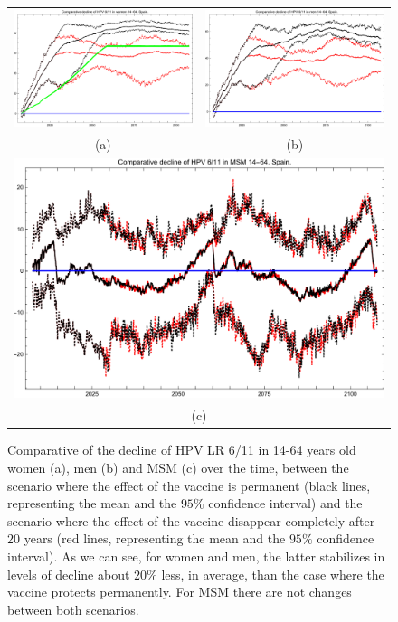 \begin{figure}[!]
	\centering
	\begin{tabular}{cc}
		\includegraphics[width=0.5\linewidth]{IMGs/5.-Caida_brusca/Decl_muj_14_64_verr_Caida.pdf}	& 
		\includegraphics[width=0.5\linewidth]{IMGs/5.-Caida_brusca/Decl_hom_14_64_verr_Caida.pdf}  \\ 
		(a)	& (b) \\ 
		\multicolumn{2}{c}{ \includegraphics[width=0.5\linewidth]{IMGs/5.-Caida_brusca/Decl_MSM_14_64_verr_Caida.pdf} } \\ 
		\multicolumn{2}{c}{(c)} \\ 
	\end{tabular} 
	\caption{Comparative of the decline of HPV LR 6/11 in 14-64 years old women (a), men (b) and MSM (c) over the time, between the scenario where the effect of the vaccine is permanent (black lines, representing  the mean and the $95\%$ confidence interval) and the scenario where the effect of the vaccine disappear completely after $20$ years (red lines, representing  the mean and the $95\%$ confidence interval). As we can see, for women and men, the latter stabilizes in levels of decline about $20\%$ less, in average, than the case where the vaccine protects permanently. For MSM there are not changes between both scenarios.}
	\label{fig:dropLRESP}
\end{figure}

